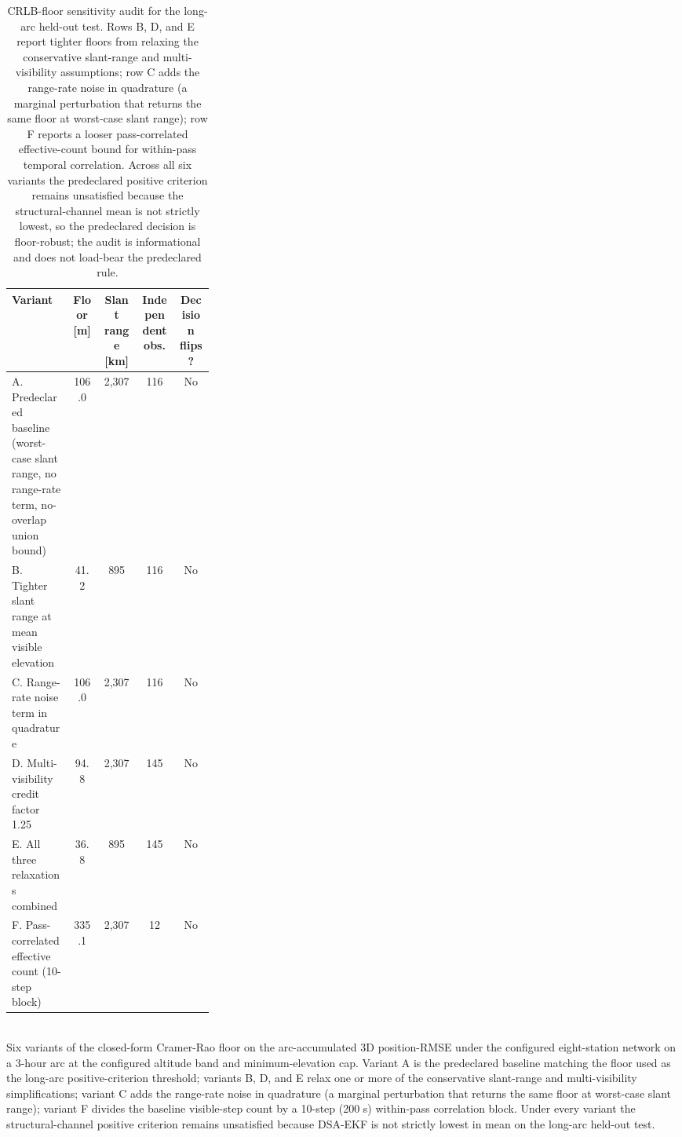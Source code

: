 \begin{table}[t]
  \centering\small
  \caption{CRLB-floor sensitivity audit for the long-arc held-out test. Rows B, D, and E report tighter floors from relaxing the conservative slant-range and multi-visibility assumptions; row C adds the range-rate noise in quadrature (a marginal perturbation that returns the same floor at worst-case slant range); row F reports a looser pass-correlated effective-count bound for within-pass temporal correlation. Across all six variants the predeclared positive criterion remains unsatisfied because the structural-channel mean is not strictly lowest, so the predeclared decision is floor-robust; the audit is informational and does not load-bear the predeclared rule.}
  \label{tab:crlb_floor_sensitivity}
  \begin{tabular}{p{0.30\linewidth}cccc}
    \toprule
    Variant & Floor [m] & Slant range [km] & Independent obs. & Decision flips? \\
    \midrule
    A. Predeclared baseline (worst-case slant range, no range-rate term, no-overlap union bound) & 106.0 & 2,307 & 116 & No \\
    B. Tighter slant range at mean visible elevation & 41.2 & 895 & 116 & No \\
    C. Range-rate noise term in quadrature & 106.0 & 2,307 & 116 & No \\
    D. Multi-visibility credit factor 1.25 & 94.8 & 2,307 & 145 & No \\
    E. All three relaxations combined & 36.8 & 895 & 145 & No \\
    F. Pass-correlated effective count (10-step block) & 335.1 & 2,307 & 12 & No \\
    \bottomrule
  \end{tabular}
  \\[2pt] {\footnotesize Six variants of the closed-form Cramer-Rao floor on the arc-accumulated 3D position-RMSE under the configured eight-station network on a 3-hour arc at the configured altitude band and minimum-elevation cap. Variant A is the predeclared baseline matching the floor used as the long-arc positive-criterion threshold; variants B, D, and E relax one or more of the conservative slant-range and multi-visibility simplifications; variant C adds the range-rate noise in quadrature (a marginal perturbation that returns the same floor at worst-case slant range); variant F divides the baseline visible-step count by a 10-step (200 s) within-pass correlation block. Under every variant the structural-channel positive criterion remains unsatisfied because DSA-EKF is not strictly lowest in mean on the long-arc held-out test.}
\end{table}